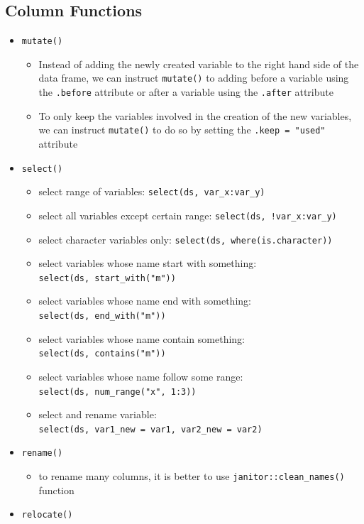 \documentclass[
  letterpaper,
  DIV=11,
  numbers=noendperiod]{scrreprt}
\providecommand{\tightlist}{%
  \setlength{\itemsep}{0pt}\setlength{\parskip}{0pt}}\usepackage{longtable,booktabs,array}
\begin{document}
\subsection{Column Functions}\label{column-functions}

\begin{itemize}
\tightlist
\item
  \texttt{mutate()}

  \begin{itemize}
  \tightlist
  \item
    Instead of adding the newly created variable to the right hand side
    of the data frame, we can instruct \texttt{mutate()} to adding
    before a variable using the \texttt{.before} attribute or after a
    variable using the \texttt{.after} attribute
  \item
    To only keep the variables involved in the creation of the new
    variables, we can instruct \texttt{mutate()} to do so by setting the
    \texttt{.keep\ =\ "used"} attribute
  \end{itemize}
\item
  \texttt{select()}

  \begin{itemize}
  \tightlist
  \item
    select range of variables: \texttt{select(ds,\ var\_x:var\_y)}
  \item
    select all variables except certain range:
    \texttt{select(ds,\ !var\_x:var\_y)}
  \item
    select character variables only:
    \texttt{select(ds,\ where(is.character))}
  \item
    select variables whose name start with something:
    \texttt{select(ds,\ start\_with("m"))}
  \item
    select variables whose name end with something:
    \texttt{select(ds,\ end\_with("m"))}
  \item
    select variables whose name contain something:
    \texttt{select(ds,\ contains("m"))}
  \item
    select variables whose name follow some range:
    \texttt{select(ds,\ num\_range("x",\ 1:3))}
  \item
    select and rename variable:
    \texttt{select(ds,\ var1\_new\ =\ var1,\ var2\_new\ =\ var2)}
  \end{itemize}
\item
  \texttt{rename()}

  \begin{itemize}
  \tightlist
  \item
    to rename many columns, it is better to use
    \texttt{janitor::clean\_names()} function
  \end{itemize}
\item
  \texttt{relocate()}


\end{itemize}
\end{document}

